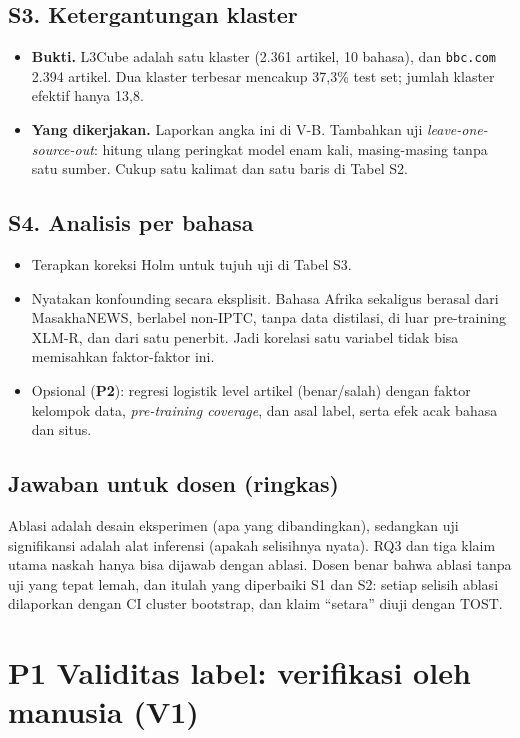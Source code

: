 \documentclass[10pt,a4paper]{article}
\newcommand{\po}{\textcolor{orange!75!black}{\textbf{P1}}}
\newcommand{\pt}{\textcolor{blue!60!black}{\textbf{P2}}}
\begin{document}
\subsection*{S3. Ketergantungan klaster}
\begin{itemize}
  \item \textbf{Bukti.} L3Cube adalah satu klaster (2.361 artikel, 10 bahasa), dan \texttt{bbc.com} 2.394 artikel. Dua klaster terbesar mencakup 37,3\% test set; jumlah klaster efektif hanya 13,8.
  \item \textbf{Yang dikerjakan.} Laporkan angka ini di V-B. Tambahkan uji \emph{leave-one-source-out}: hitung ulang peringkat model enam kali, masing-masing tanpa satu sumber. Cukup satu kalimat dan satu baris di Tabel S2.
\end{itemize}

\subsection*{S4. Analisis per bahasa}
\begin{itemize}
  \item Terapkan koreksi Holm untuk tujuh uji di Tabel S3.
  \item Nyatakan konfounding secara eksplisit. Bahasa Afrika sekaligus berasal dari MasakhaNEWS, berlabel non-IPTC, tanpa data distilasi, di luar pre-training XLM-R, dan dari satu penerbit. Jadi korelasi satu variabel tidak bisa memisahkan faktor-faktor ini.
  \item Opsional (\pt): regresi logistik level artikel (benar/salah) dengan faktor kelompok data, \emph{pre-training coverage}, dan asal label, serta efek acak bahasa dan situs.
\end{itemize}

\subsection*{Jawaban untuk dosen (ringkas)}
Ablasi adalah desain eksperimen (apa yang dibandingkan), sedangkan uji signifikansi adalah alat inferensi (apakah selisihnya nyata). RQ3 dan tiga klaim utama naskah hanya bisa dijawab dengan ablasi. Dosen benar bahwa ablasi tanpa uji yang tepat lemah, dan itulah yang diperbaiki S1 dan S2: setiap selisih ablasi dilaporkan dengan CI cluster bootstrap, dan klaim ``setara'' diuji dengan TOST.

\section{\po{} Validitas label: verifikasi oleh manusia (V1)}
\end{document}
